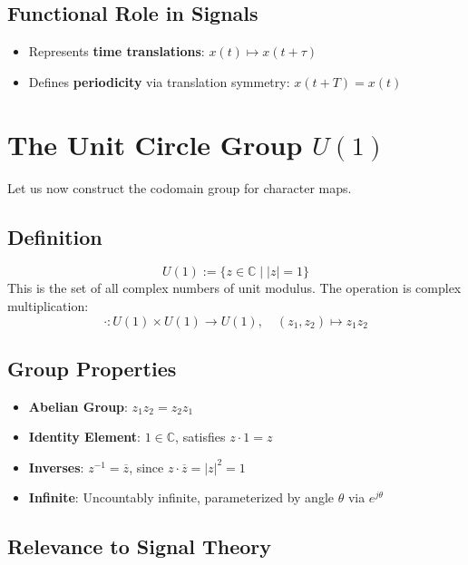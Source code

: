 \documentclass[12pt]{article}
\begin{document}
	\subsection*{Functional Role in Signals}
	
	\begin{itemize}[leftmargin=1.5em]
		\item Represents \textbf{time translations}: \(x(t) \mapsto x(t + \tau)\)
		\item Defines \textbf{periodicity} via translation symmetry: \(x(t + T) = x(t)\)
	\end{itemize}
	
	\section{The Unit Circle Group \(U(1)\)}
	
	Let us now construct the codomain group for character maps.
	
	\subsection*{Definition}
	
	\[
	U(1) := \{ z \in \mathbb{C} \mid |z| = 1 \}
	\]
	This is the set of all complex numbers of unit modulus. The operation is complex multiplication:
	\[
	\cdot\colon U(1) \times U(1) \to U(1), \quad (z_1, z_2) \mapsto z_1 z_2
	\]
	
	\subsection*{Group Properties}
	
	\begin{itemize}[leftmargin=1.5em]
		\item \textbf{Abelian Group}: \(z_1 z_2 = z_2 z_1\)
		\item \textbf{Identity Element}: \(1 \in \mathbb{C}\), satisfies \(z \cdot 1 = z\)
		\item \textbf{Inverses}: \(z^{-1} = \overline{z}\), since \(z \cdot \overline{z} = |z|^2 = 1\)
		\item \textbf{Infinite}: Uncountably infinite, parameterized by angle \(\theta\) via \(e^{j\theta}\)
	\end{itemize}
	
	\subsection*{Relevance to Signal Theory}
	
\end{document}
